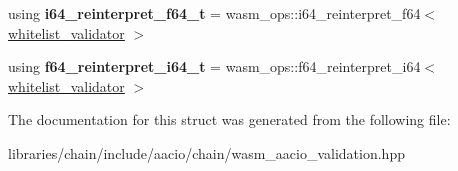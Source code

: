 \begin{DoxyCompactItemize}
using {\bfseries i64\+\_\+reinterpret\+\_\+f64\+\_\+t} = wasm\+\_\+ops\+::i64\+\_\+reinterpret\+\_\+f64$<$ \mbox{\hyperlink{structaacio_1_1chain_1_1wasm__validations_1_1whitelist__validator}{whitelist\+\_\+validator}} $>$
\item 
\mbox{\label{structaacio_1_1chain_1_1wasm__validations_1_1op__constrainers_a84b2409c10e90351608c0733520f0c1f}} 
using {\bfseries f64\+\_\+reinterpret\+\_\+i64\+\_\+t} = wasm\+\_\+ops\+::f64\+\_\+reinterpret\+\_\+i64$<$ \mbox{\hyperlink{structaacio_1_1chain_1_1wasm__validations_1_1whitelist__validator}{whitelist\+\_\+validator}} $>$
\end{DoxyCompactItemize}


The documentation for this struct was generated from the following file\+:\begin{DoxyCompactItemize}
\item 
libraries/chain/include/aacio/chain/wasm\+\_\+aacio\+\_\+validation.\+hpp\end{DoxyCompactItemize}

